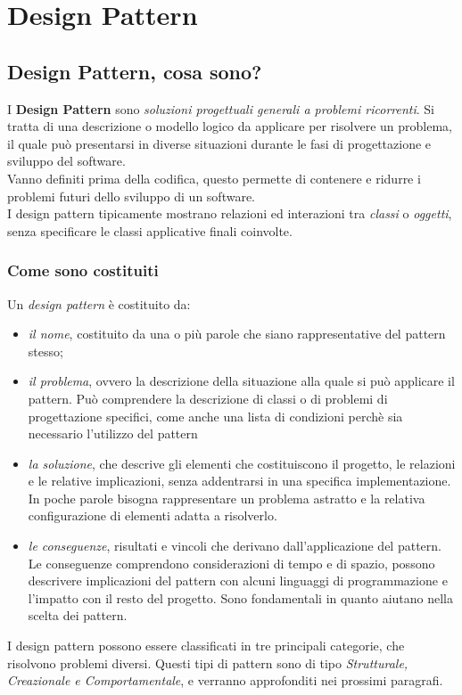 \chapter{Design Pattern}
\section{Design Pattern, cosa sono?}
I \textbf{Design Pattern} sono \textit{soluzioni progettuali generali a problemi ricorrenti}. Si tratta di una descrizione o modello logico da applicare per risolvere un problema, il quale può presentarsi in diverse situazioni durante le fasi di progettazione e sviluppo del software.\\
Vanno definiti prima della codifica, questo permette di contenere e ridurre i problemi futuri dello sviluppo di un software.\\
I design pattern tipicamente mostrano relazioni ed interazioni tra \textit{classi} o \textit{oggetti}, senza specificare le classi applicative finali coinvolte.

\subsection{Come sono costituiti}
Un \textit{design pattern} è costituito da:
\begin{itemize}
	\item \textit{il nome}, costituito da una o più parole che siano rappresentative del pattern stesso;
	\item \textit{il problema}, ovvero la descrizione della situazione alla quale si può applicare il pattern. Può comprendere la descrizione di classi o di problemi di progettazione specifici, come anche una lista di condizioni perchè sia necessario l'utilizzo del pattern
	\item \textit{la soluzione}, che descrive gli elementi che costituiscono il progetto, le relazioni e le relative implicazioni, senza addentrarsi in una specifica implementazione. In poche parole bisogna rappresentare un problema astratto e la relativa configurazione di elementi adatta a risolverlo.
	\item \textit{le conseguenze}, risultati e vincoli che derivano dall'applicazione del pattern. Le conseguenze comprendono considerazioni di tempo e di spazio, possono descrivere implicazioni del pattern con alcuni linguaggi di programmazione e l'impatto con il resto del progetto. Sono fondamentali in quanto aiutano nella scelta dei pattern.
\end{itemize}
I design pattern possono essere classificati in tre principali categorie, che risolvono problemi diversi. Questi tipi di pattern sono di tipo \textit{Strutturale, Creazionale e Comportamentale}, e verranno approfonditi nei prossimi paragrafi.

